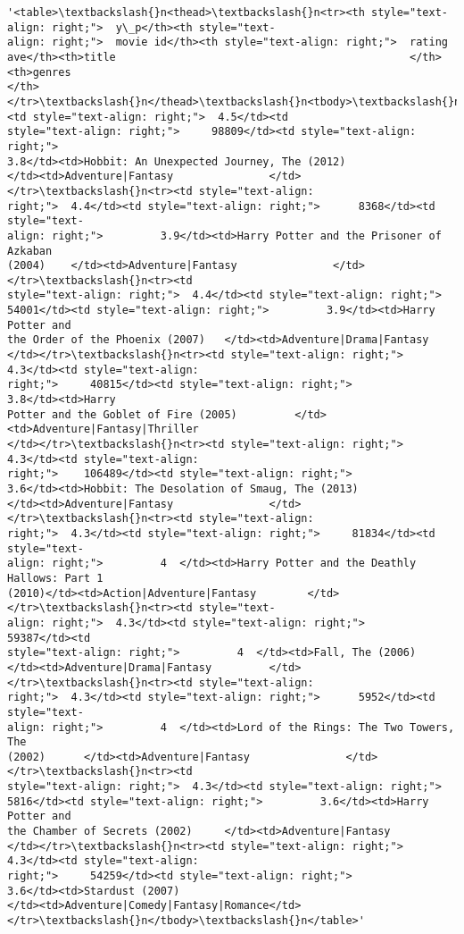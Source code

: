 \documentclass[11pt]{article}
\makeatletter
\newcommand{\boxspacing}{\kern\kvtcb@left@rule\kern\kvtcb@boxsep}
\newcommand{\prompt}[4]{
        \ttfamily\llap{{\color{#2}[#3]:\hspace{3pt}#4}}\vspace{-\baselineskip}
    }
\makeatother
\begin{document}
            \begin{tcolorbox}[breakable, size=fbox, boxrule=.5pt, pad at break*=1mm, opacityfill=0]
\prompt{Out}{outcolor}{17}{\boxspacing}
\begin{Verbatim}[commandchars=\\\{\}]
'<table>\textbackslash{}n<thead>\textbackslash{}n<tr><th style="text-align: right;">  y\_p</th><th style="text-
align: right;">  movie id</th><th style="text-align: right;">  rating
ave</th><th>title                                              </th><th>genres
</th></tr>\textbackslash{}n</thead>\textbackslash{}n<tbody>\textbackslash{}n<tr><td style="text-align: right;">  4.5</td><td
style="text-align: right;">     98809</td><td style="text-align: right;">
3.8</td><td>Hobbit: An Unexpected Journey, The (2012)
</td><td>Adventure|Fantasy               </td></tr>\textbackslash{}n<tr><td style="text-align:
right;">  4.4</td><td style="text-align: right;">      8368</td><td style="text-
align: right;">         3.9</td><td>Harry Potter and the Prisoner of Azkaban
(2004)    </td><td>Adventure|Fantasy               </td></tr>\textbackslash{}n<tr><td
style="text-align: right;">  4.4</td><td style="text-align: right;">
54001</td><td style="text-align: right;">         3.9</td><td>Harry Potter and
the Order of the Phoenix (2007)   </td><td>Adventure|Drama|Fantasy
</td></tr>\textbackslash{}n<tr><td style="text-align: right;">  4.3</td><td style="text-align:
right;">     40815</td><td style="text-align: right;">         3.8</td><td>Harry
Potter and the Goblet of Fire (2005)         </td><td>Adventure|Fantasy|Thriller
</td></tr>\textbackslash{}n<tr><td style="text-align: right;">  4.3</td><td style="text-align:
right;">    106489</td><td style="text-align: right;">
3.6</td><td>Hobbit: The Desolation of Smaug, The (2013)
</td><td>Adventure|Fantasy               </td></tr>\textbackslash{}n<tr><td style="text-align:
right;">  4.3</td><td style="text-align: right;">     81834</td><td style="text-
align: right;">         4  </td><td>Harry Potter and the Deathly Hallows: Part 1
(2010)</td><td>Action|Adventure|Fantasy        </td></tr>\textbackslash{}n<tr><td style="text-
align: right;">  4.3</td><td style="text-align: right;">     59387</td><td
style="text-align: right;">         4  </td><td>Fall, The (2006)
</td><td>Adventure|Drama|Fantasy         </td></tr>\textbackslash{}n<tr><td style="text-align:
right;">  4.3</td><td style="text-align: right;">      5952</td><td style="text-
align: right;">         4  </td><td>Lord of the Rings: The Two Towers, The
(2002)      </td><td>Adventure|Fantasy               </td></tr>\textbackslash{}n<tr><td
style="text-align: right;">  4.3</td><td style="text-align: right;">
5816</td><td style="text-align: right;">         3.6</td><td>Harry Potter and
the Chamber of Secrets (2002)     </td><td>Adventure|Fantasy
</td></tr>\textbackslash{}n<tr><td style="text-align: right;">  4.3</td><td style="text-align:
right;">     54259</td><td style="text-align: right;">
3.6</td><td>Stardust (2007)
</td><td>Adventure|Comedy|Fantasy|Romance</td></tr>\textbackslash{}n</tbody>\textbackslash{}n</table>'
\end{Verbatim}
\end{tcolorbox}
        
\end{document}
